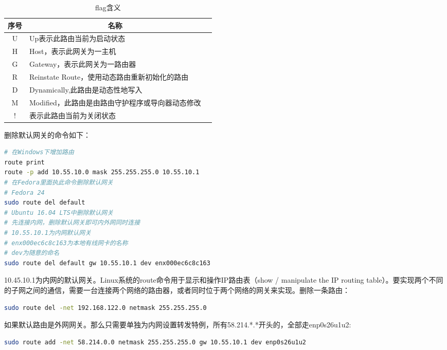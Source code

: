 \documentclass[12pt]{book}
\numberwithin{dummy}{section}
\theoremstyle{ocrenumbox}
\theoremstyle{blacknumex}
\theoremstyle{blacknumbox}
\theoremstyle{ocrenum}
\begin{document}
\begin{table}
	\begin{center}
		\caption{flag含义}
		\bigskip
		\label{table:flagmeaning}
		\begin{tabular}{cp{10cm}c}
			\hline
			\multirow{1}{*}{序号}
			& \multicolumn{1}{c}{名称}  \\
			\hline			
			U  & Up表示此路由当前为启动状态 \\	
			H & Host，表示此网关为一主机 \\
			G & Gateway，表示此网关为一路由器\\
			R & Reinstate Route，使用动态路由重新初始化的路由\\
			D & Dynamically,此路由是动态性地写入\\
			M & Modified，此路由是由路由守护程序或导向器动态修改\\
			! & 表示此路由当前为关闭状态\\
			\hline
		\end{tabular}
	\end{center}
\end{table}

删除默认网关的命令如下：

\begin{lstlisting}[language=Bash]
# 在Windows下增加路由
route print
route -p add 10.55.10.0 mask 255.255.255.0 10.55.10.1
# 在Fedora里面执此命令删除默认网关
# Fedora 24
sudo route del default
# Ubuntu 16.04 LTS中删除默认网关
# 先连接内网，删除默认网关即可内外网同时连接
# 10.55.10.1为内网默认网关
# enx000ec6c8c163为本地有线网卡的名称
# dev为随意的命名
sudo route del default gw 10.55.10.1 dev enx000ec6c8c163
\end{lstlisting}

10.45.10.1为内网的默认网关。Linux系统的route命令用于显示和操作IP路由表（show / manipulate the IP routing table）。要实现两个不同的子网之间的通信，需要一台连接两个网络的路由器，或者同时位于两个网络的网关来实现。删除一条路由：

\begin{lstlisting}[language=Bash]
sudo route del -net 192.168.122.0 netmask 255.255.255.0
\end{lstlisting}

如果默认路由是外网网关。那么只需要单独为内网设置转发特例，所有58.214.*.*开头的，全部走enp0s26u1u2:

\begin{lstlisting}[language=Bash]
sudo route add -net 58.214.0.0 netmask 255.255.255.0 gw 10.55.10.1 dev enp0s26u1u2
\end{lstlisting}
\end{document}

